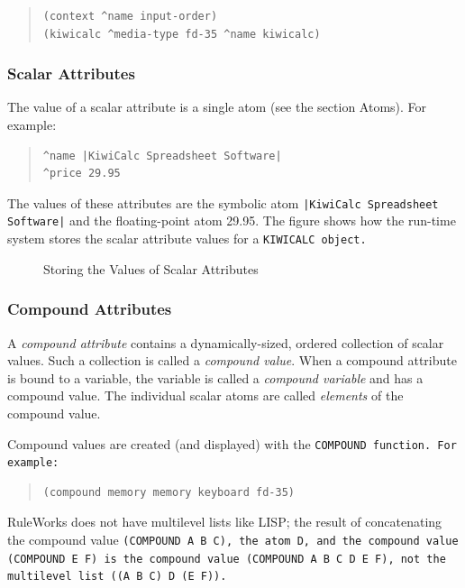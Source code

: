 \begin{quote}
\begin{verbatim}
(context ^name input-order)
(kiwicalc ^media-type fd-35 ^name kiwicalc)
\end{verbatim}
\end{quote}

\subsubsection{Scalar Attributes}

The value of a scalar attribute is a single atom (see the
section Atoms). For example:

\begin{quote}
\begin{verbatim}
^name |KiwiCalc Spreadsheet Software|
^price 29.95
\end{verbatim}
\end{quote}

The values of these attributes are the symbolic atom
\verb,|KiwiCalc Spreadsheet Software|, and the floating-point atom
29.95. The figure shows how the run-time system stores the
scalar attribute values for a \tt{KIWICALC} object.

\begin{figure}[h]
  \centering
  
  \caption{Storing the Values of Scalar Attributes}
  \label{f:2-5}
\end{figure}

\subsubsection*{Compound Attributes}

A \emph{compound attribute} contains a dynamically-sized, ordered
collection of scalar values. Such a collection is called a
\emph{compound value}. When a compound attribute is bound to a
variable, the variable is called a \emph{compound variable} and has a
compound value. The individual scalar atoms are called \emph{elements}
of the compound value.

Compound values are created (and displayed) with the \tt{COMPOUND}
function. For example:

\begin{quote}
\begin{verbatim}
(compound memory memory keyboard fd-35)
\end{verbatim}
\end{quote}

RuleWorks does not have multilevel lists like LISP; the
result of concatenating the compound value \tt{(COMPOUND A B C)},
the atom \tt{D}, and the compound value \tt{(COMPOUND E F)} is the
compound value \tt{(COMPOUND A B C D E F)}, not the multilevel
list \tt{((A B C) D (E F))}.

